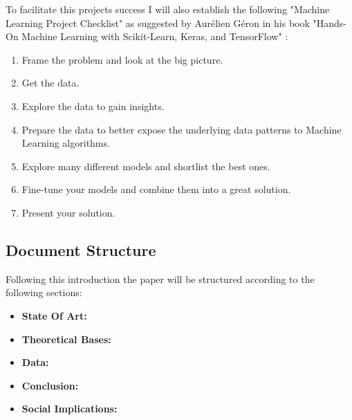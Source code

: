 \documentclass[12pt, a4paper]{article}
\begin{document}
	To facilitate this projects success I will also establish the following "Machine Learning Project Checklist" as suggested by Aurélien Géron in his book "Hands-On Machine Learning with Scikit-Learn, Keras, and TensorFlow" \cite{handsonmachinelearning}:
	
	 \begin{enumerate}
	 	\item Frame the problem and look at the big picture.
	 	
	 	\item Get the data.
	 	
	 	\item Explore the data to gain insights.
	 	
	 	\item Prepare the data to better expose the underlying data patterns to Machine Learning algorithms.
	 	
	 	\item Explore many different models and shortlist the best ones.
	 	
	 	\item Fine-tune your models and combine them into a great solution.
	 	
	 	\item Present your solution.
	 \end{enumerate}
	
	
	\clearpage
	
	\subsection{Document Structure}
	
	Following this introduction the paper will be structured according to the following sections:
	
	\begin{itemize}
		
		\item \textbf{State Of Art:}
		
		\item \textbf{Theoretical Bases:}   
		
		\item \textbf{Data:}
		
		\item \textbf{Conclusion:}
		
		\item \textbf{Social Implications:}
		
	\end{itemize}

	\clearpage
	
\end{document}
